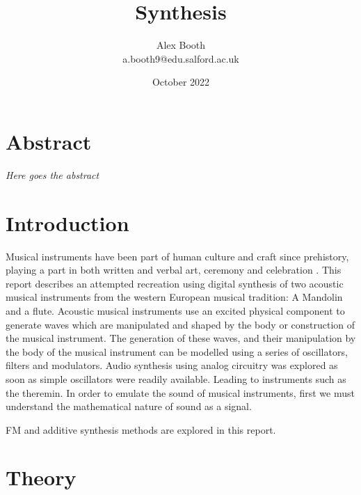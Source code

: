 \documentclass{article}
\title{Synthesis}
\author{Alex Booth\\ a.booth9@edu.salford.ac.uk}
\date{October 2022}
\begin{document}
\maketitle
\section{Abstract}
    \textit{Here goes the abstract}
\section{Introduction}
    Musical instruments have been part of human culture and craft since prehistory, playing a part in both written and verbal art, ceremony and celebration \cite{rault}.
    This report describes an attempted recreation using digital synthesis of two acoustic musical instruments from the western European musical tradition: A Mandolin and a flute.
    Acoustic musical instruments use an excited physical component to generate waves which are manipulated and shaped by the body or construction of the musical instrument. %
    The generation of these waves, and their manipulation by the body of the musical instrument can be modelled using a series of oscillators, filters and modulators.
    Audio synthesis using analog circuitry was explored as soon as simple oscillators were readily available. Leading to instruments such as the theremin.  %
    In order to emulate the sound of musical instruments, first we must understand the mathematical nature of sound as a signal.

    FM and additive synthesis methods are explored in this report.

\section{Theory}
\end{document}
